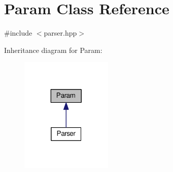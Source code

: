 \hypertarget{classParam}{\section{Param Class Reference}
\label{classParam}
}


{\ttfamily \#include $<$parser.\-hpp$>$}



Inheritance diagram for Param\-:\nopagebreak
\begin{figure}[H]
\begin{center}
\leavevmode
\includegraphics[width=124pt]{classParam__inherit__graph}
\end{center}
\end{figure}
